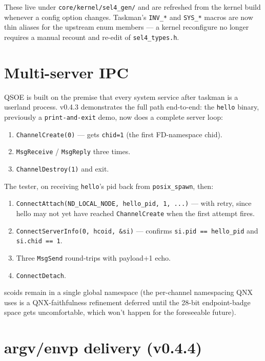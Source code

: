 These live under \texttt{core/kernel/sel4\_gen/} and are refreshed
from the kernel build whenever a config option changes.  Taskman's
\texttt{INV\_*} and \texttt{SYS\_*} macros are now thin aliases for
the upstream enum members --- a kernel reconfigure no longer requires
a manual recount and re-edit of \texttt{sel4\_types.h}.

\section{Multi-server IPC}

QSOE is built on the premise that every system service after taskman
is a userland process.  v0.4.3 demonstrates the full path end-to-end:
the \texttt{hello} binary, previously a \texttt{print-and-exit} demo,
now does a complete server loop:

\begin{enumerate}
    \item \texttt{ChannelCreate(0)} --- gets \texttt{chid=1} (the
          first FD-namespace chid).
    \item \texttt{MsgReceive} / \texttt{MsgReply} three times.
    \item \texttt{ChannelDestroy(1)} and exit.
\end{enumerate}

The tester, on receiving \texttt{hello}'s pid back from
\texttt{posix\_spawn}, then:

\begin{enumerate}
    \item \texttt{ConnectAttach(ND\_LOCAL\_NODE, hello\_pid, 1, ...)}
          --- with retry, since hello may not yet have reached
          \texttt{ChannelCreate} when the first attempt fires.
    \item \texttt{ConnectServerInfo(0, hcoid, \&si)} --- confirms
          \texttt{si.pid == hello\_pid} and \texttt{si.chid == 1}.
    \item Three \texttt{MsgSend} round-trips with payload+1 echo.
    \item \texttt{ConnectDetach}.
\end{enumerate}

scoids remain in a single global namespace (the per-channel
namespacing QNX uses is a QNX-faithfulness refinement deferred until
the 28-bit endpoint-badge space gets uncomfortable, which won't
happen for the foreseeable future).

\section{argv/envp delivery (v0.4.4)}

